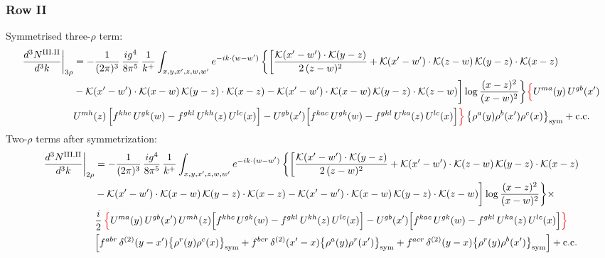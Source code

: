 \documentclass[9pt]{article}
\numberwithin{equation}{section}
\begin{document}
\subsubsection*{Row II}
Symmetrised three-$\rho$ term:
\begin{align}
\frac{d^{3}N^{\rm III.II}}{d^{3}k}\bigg|_{3\rho}&=-\frac{1}{(2\pi)^{3}}\,\frac{ig^{4}}{8\pi^{5}}\,\frac{1}{k^{+}}\int_{x,y,x',z,w,w'}e^{-ik\cdot{(w-w')}}\,\bigg\{\bigg[\frac{\mathcal{K}(x'-w')\cdot\mathcal{K}(y-z)}{2\,(z-w)^{2}}+\mathcal{K}(x'-w')\cdot\mathcal{K}(z-w)\,\mathcal{K}(y-z)\cdot\mathcal{K}(x-z)\notag\\
&-\mathcal{K}(x'-w')\cdot\mathcal{K}(x-w)\,\mathcal{K}(y-z)\cdot\mathcal{K}(x-z)-\mathcal{K}(x'-w')\cdot\mathcal{K}(x-w)\,\mathcal{K}(y-z)\cdot\mathcal{K}(z-w)\bigg]\log\frac{(x-z)^{2}}{(x-w)^{2}}\bigg\}{\color{red}\Big\{}U^{ma}(y)\,U^{gb}(x')\notag \\ & U^{mh}(z)\,\Big[f^{khc}\,U^{gk}(w)-f^{gkl}\,U^{kh}(z)\,U^{lc}(x)\Big]-U^{gb}(x')\Big[f^{kac}\,U^{gk}(w)-f^{gkl}\,U^{ka}(z)\,U^{lc}(x)\Big]{\color{red}\Big\}}\,\big\{\rho^{a}(y)\rho^{b}(x')\rho^{c}(x)\big\}_{\rm sym}+{\rm c.c.}\label{eq:D-III.II-3}
\end{align}
Two-$\rho$ terms after symmetrization:
\begin{align}
\frac{d^{3}N^{\rm III.II}}{d^{3}k}\bigg|_{2\rho}&=-\frac{1}{(2\pi)^{3}}\,\frac{ig^{4}}{8\pi^{5}}\,\frac{1}{k^{+}}\int_{x,y,x',z,w,w'}e^{-ik\cdot{(w-w')}}\,\bigg\{\bigg[\frac{\mathcal{K}(x'-w')\cdot\mathcal{K}(y-z)}{2\,(z-w)^{2}}+\mathcal{K}(x'-w')\cdot\mathcal{K}(z-w)\,\mathcal{K}(y-z)\cdot\mathcal{K}(x-z)\notag\\
&-\mathcal{K}(x'-w')\cdot\mathcal{K}(x-w)\,\mathcal{K}(y-z)\cdot\mathcal{K}(x-z)-\mathcal{K}(x'-w')\cdot\mathcal{K}(x-w)\,\mathcal{K}(y-z)\cdot\mathcal{K}(z-w)\bigg]\log\frac{(x-z)^{2}}{(x-w)^{2}}\bigg\}\times\,\notag\\
& \frac{i}{2}\,{\color{red}\Big\{}U^{ma}(y)\,U^{gb}(x')\,U^{mh}(z)\Big[f^{khc}\,U^{gk}(w)-f^{gkl}\,U^{kh}(z)\,U^{lc}(x)\Big]-U^{gb}(x')\Big[f^{kac}\,U^{gk}(w)-f^{gkl}\,U^{ka}(z)\,U^{lc}(x)\Big]{\color{red}\Big\}}\notag \\ & \Big[f^{abr}\,\delta^{(2)}(y-x')\big\{\rho^{r}(y)\rho^{c}(x)\big\}_{\rm sym} +f^{bcr}\,\delta^{(2)}(x'-x)\big\{\rho^{a}(y)\rho^{r}(x')\big\}_{\rm sym} +f^{acr}\,\delta^{(2)}(y-x)\big\{\rho^{r}(y)\rho^{b}(x')\big\}_{\rm sym}\Big]+{\rm c.c.}\label{eq:D-III.II-2}
\end{align}
\end{document}
